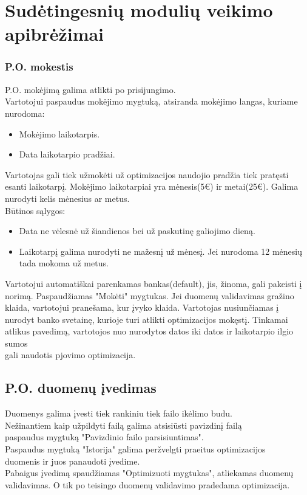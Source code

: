 \documentclass[a4paper,12pt]{article}
\begin{document}
\section{Sudėtingesnių modulių veikimo apibrėžimai}

\subsubsection{P.O. mokestis}
P.O. mokėjimą galima atlikti po prisijungimo. \\
Vartotojui paspaudus mokėjimo mygtuką, atsiranda mokėjimo langas, kuriame nurodoma:
\begin{itemize}
	\item Mokėjimo laikotarpis.
	\item Data laikotarpio pradžiai. 
\end{itemize} 

Vartotojas gali tiek užmokėti už optimizacijos naudojio pradžia tiek pratęsti esanti laikotarpį.
Mokėjimo laikotarpiai yra mėnesis(5€) ir metai(25€). Galima nurodyti kelis mėnesius ar metus. \\
Būtinos sąlygos:
\begin{itemize}
	\item Data ne vėlesnė už šiandienos bei už paskutinę galiojimo dieną.
	\item Laikotarpį galima nurodyti ne mažesnį už mėnesį. Jei nurodoma 12 mėnesių tada mokoma už metus.
\end{itemize}

Vartotojui automatiškai parenkamas bankas(default), jis, žinoma, gali pakeisti į norimą.
Paspaudžiamas "Mokėti" mygtukas.
Jei duomenų validavimas gražino klaida, vartotojui pranešama, kur įvyko klaida.
Vartotojas nusiunčiamas į nurodyt banko svetainę, kurioje turi atlikti optimizacijos mokęstį.
Tinkamai atlikus pavedimą, vartotojos nuo nurodytos datos iki datos ir laikotarpio ilgio sumos\\
gali naudotis pjovimo optimizacija.
	
\subsection{ P.O. duomenų įvedimas }

Duomenys galima įvesti tiek rankiniu tiek failo ikėlimo budu.\\
Nežinantiem kaip užpildyti failą galima atsisiūsti pavizdinį failą\\
paspaudus mygtuką "Pavizdinio failo parsisiuntimas".\\
Paspaudus mygtuką "Istorija" galima peržvelgti praeitus optimizacijos \\
duomenis ir juos panaudoti įvedime.\\
Pabaigus įvedimą spaudžiamas "Optimizuoti mygtukas", atliekamas duomenų\\ validavimas. O tik po teisingo duomenų validavimo pradedama optimizacija.
\end{document}
